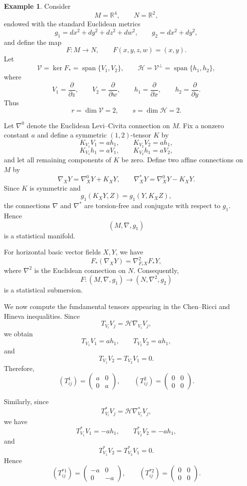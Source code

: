 \documentclass[10pt,a4paper]{article}
\theoremstyle{definition}
\newtheorem{example}[theorem]{Example}
\theoremstyle{remark}
\numberwithin{equation}{section}
\begin{document}
\begin{example}
Consider
\[
M=\mathbb{R}^{4},\qquad N=\mathbb{R}^{2},
\]
endowed with the standard Euclidean metrics
\[
g_{1}=dx^{2}+dy^{2}+dz^{2}+dw^{2},
\qquad
g_{2}=dx^{2}+dy^{2},
\]
and define the map
\[
F:M\longrightarrow N,\qquad
F(x,y,z,w)=(x,y).
\]
Let
\[
\mathcal{V}=\ker F_{*}
=\operatorname{span}\{V_{1},V_{2}\},
\qquad
\mathcal{H}=\mathcal{V}^{\perp}
=\operatorname{span}\{h_{1},h_{2}\},
\]
where
\[
V_{1}=\frac{\partial}{\partial z},\qquad
V_{2}=\frac{\partial}{\partial w},\qquad
h_{1}=\frac{\partial}{\partial x},\qquad
h_{2}=\frac{\partial}{\partial y}.
\]
Thus
\[
r=\dim\mathcal{V}=2,\qquad
s=\dim\mathcal{H}=2.
\]

Let $\nabla^{0}$ denote the Euclidean Levi--Civita connection on
$M$. Fix a nonzero constant $a$ and define a symmetric $(1,2)$-tensor
$K$ by
\[
K_{V_{1}}V_{1}=ah_{1},\qquad
K_{V_{2}}V_{2}=ah_{1},
\]
\[
K_{V_{1}}h_{1}=aV_{1},\qquad
K_{V_{2}}h_{1}=aV_{2},
\]
and let all remaining components of $K$ be zero. Define two affine
connections on $M$ by
\[
\nabla_{X}Y=\nabla^{0}_{X}Y+K_{X}Y,
\qquad
\nabla^{*}_{X}Y=\nabla^{0}_{X}Y-K_{X}Y.
\]
Since $K$ is symmetric and
\[
g_{1}(K_{X}Y,Z)=g_{1}(Y,K_{X}Z),
\]
the connections $\nabla$ and $\nabla^{*}$ are torsion-free and
conjugate with respect to $g_{1}$. Hence
\[
(M,\nabla,g_{1})
\]
is a statistical manifold.

For horizontal basic vector fields $X,Y$, we have
\[
F_{*}(\nabla_{X}Y)
=\nabla^{2}_{F_{*}X}F_{*}Y,
\]
where $\nabla^{2}$ is the Euclidean connection on $N$. Consequently,
\[
F:(M,\nabla,g_{1})\longrightarrow
(N,\nabla^{2},g_{2})
\]
is a statistical submersion.

We now compute the fundamental tensors appearing in the
Chen--Ricci and Hineva inequalities. Since
\[
T_{V_{i}}V_{j}
=\mathcal{H}\nabla_{V_{i}}V_{j},
\]
we obtain
\[
T_{V_{1}}V_{1}=ah_{1},\qquad
T_{V_{2}}V_{2}=ah_{1},
\]
and
\[
T_{V_{1}}V_{2}
=T_{V_{2}}V_{1}=0.
\]
Therefore,
\[
\left(T^{1}_{ij}\right)
=
\begin{pmatrix}
a&0\\
0&a
\end{pmatrix},
\qquad
\left(T^{2}_{ij}\right)
=
\begin{pmatrix}
0&0\\
0&0
\end{pmatrix}.
\]

Similarly, since
\[
T^{*}_{V_{i}}V_{j}
=\mathcal{H}\nabla^{*}_{V_{i}}V_{j},
\]
we have
\[
T^{*}_{V_{1}}V_{1}=-ah_{1},
\qquad
T^{*}_{V_{2}}V_{2}=-ah_{1},
\]
and
\[
T^{*}_{V_{1}}V_{2}
=T^{*}_{V_{2}}V_{1}=0.
\]
Hence
\[
\left(T^{*1}_{ij}\right)
=
\begin{pmatrix}
-a&0\\
0&-a
\end{pmatrix},
\qquad
\left(T^{*2}_{ij}\right)
=
\begin{pmatrix}
0&0\\
0&0
\end{pmatrix}.
\]


\end{example}
\end{document}
